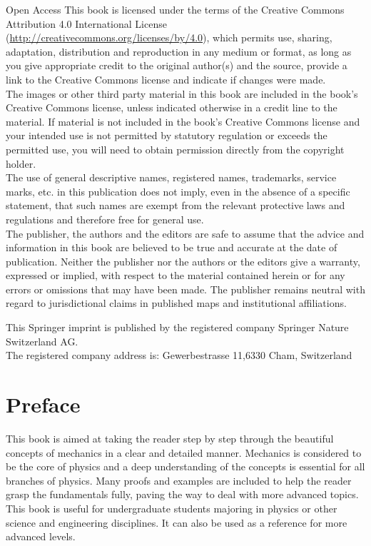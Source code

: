 \documentclass[10pt]{article}
\begin{document}
Open Access This book is licensed under the terms of the Creative Commons Attribution 4.0 International License (\href{http://creativecommons.org/licenses/by/4.0}{http://creativecommons.org/licenses/by/4.0}), which permits use, sharing, adaptation, distribution and reproduction in any medium or format, as long as you give appropriate credit to the original author(s) and the source, provide a link to the Creative Commons license and indicate if changes were made.\\
The images or other third party material in this book are included in the book's Creative Commons license, unless indicated otherwise in a credit line to the material. If material is not included in the book's Creative Commons license and your intended use is not permitted by statutory regulation or exceeds the permitted use, you will need to obtain permission directly from the copyright holder.\\
The use of general descriptive names, registered names, trademarks, service marks, etc. in this publication does not imply, even in the absence of a specific statement, that such names are exempt from the relevant protective laws and regulations and therefore free for general use.\\
The publisher, the authors and the editors are safe to assume that the advice and information in this book are believed to be true and accurate at the date of publication. Neither the publisher nor the authors or the editors give a warranty, expressed or implied, with respect to the material contained herein or for any errors or omissions that may have been made. The publisher remains neutral with regard to jurisdictional claims in published maps and institutional affiliations.

This Springer imprint is published by the registered company Springer Nature Switzerland AG.\\
The registered company address is: Gewerbestrasse 11,6330 Cham, Switzerland

\section*{Preface}
This book is aimed at taking the reader step by step through the beautiful concepts of mechanics in a clear and detailed manner. Mechanics is considered to be the core of physics and a deep understanding of the concepts is essential for all branches of physics. Many proofs and examples are included to help the reader grasp the fundamentals fully, paving the way to deal with more advanced topics. This book is useful for undergraduate students majoring in physics or other science and engineering disciplines. It can also be used as a reference for more advanced levels.
\end{document}
